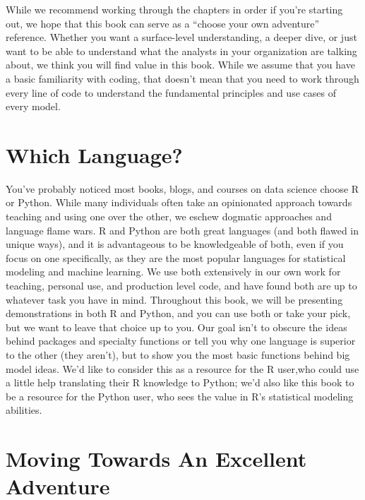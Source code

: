 \documentclass[
  letterpaper,
]{krantz}
\begin{document}
While we recommend working through the chapters in order if you're
starting out, we hope that this book can serve as a ``choose your own
adventure'' reference. Whether you want a surface-level understanding, a
deeper dive, or just want to be able to understand what the analysts in
your organization are talking about, we think you will find value in
this book. While we assume that you have a basic familiarity with
coding, that doesn't mean that you need to work through every line of
code to understand the fundamental principles and use cases of every
model.

\section*{Which Language?}\label{which-language}


{\Huge{}} {\Huge{}}

You've probably noticed most books, blogs, and courses on data science
choose R or Python. While many individuals often take an opinionated
approach towards teaching and using one over the other, we eschew
dogmatic approaches and language flame wars. R and Python are both great
languages (and both flawed in unique ways), and it is advantageous to be
knowledgeable of both, even if you focus on one specifically, as they
are the most popular languages for statistical modeling and machine
learning. We use both extensively in our own work for teaching, personal
use, and production level code, and have found both are up to whatever
task you have in mind. Throughout this book, we will be presenting
demonstrations in both R and Python, and you can use both or take your
pick, but we want to leave that choice up to you. Our goal isn't to
obscure the ideas behind packages and specialty functions or tell you
why one language is superior to the other (they aren't), but to show you
the most basic functions behind big model ideas. We'd like to consider
this as a resource for the R user,who could use a little help
translating their R knowledge to Python; we'd also like this book to be
a resource for the Python user, who sees the value in R's statistical
modeling abilities.

\section*{Moving Towards An Excellent
Adventure}\label{moving-towards-an-excellent-adventure}
\end{document}
